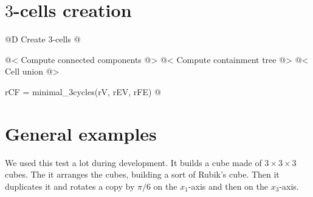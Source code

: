 \section{$3$-cells creation}

@D Create 3-cells
@{@< Compute connected components @>
@< Compute containment tree @>
@< Cell union @>

rCF = minimal_3cycles(rV, rEV, rFE)
@}


\section{General examples}
\label{sec:spatial_arrangement_examples}

We used this test a lot during development. It builds
a cube made of $3 \times 3 \times 3$ cubes. The it arranges
the cubes, building a sort of Rubik's cube. Then it duplicates
it and rotates a copy by $\pi / 6$ on the $x_1$-axis
and then on the $x_3$-axis.

